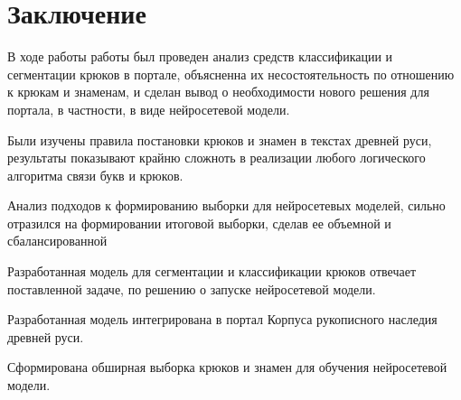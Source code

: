 \chapter*{Заключение}

В ходе работы работы был проведен анализ средств классификации и сегментации крюков в портале, 
объясненна их несостоятельность по отношению к крюкам и знаменам, и сделан вывод о необходимости 
нового решения для портала, в частности, в виде нейросетевой модели.

Были изучены правила постановки крюков и знамен в текстах древней руси, результаты показывают крайню 
сложноть в реализации любого логического алгоритма связи букв и крюков.

Анализ подходов к формированию выборки для нейросетевых моделей, сильно отразился на формировании итоговой
выборки, сделав ее объемной и сбалансированной

Разработанная модель для сегментации и классификации крюков отвечает поставленной задаче, по решению 
о запуске нейросетевой модели.

Разработанная модель интегрирована в портал Корпуса рукописного наследия древней руси.

Сформирована обширная выборка крюков и знамен для обучения нейросетевой модели.


